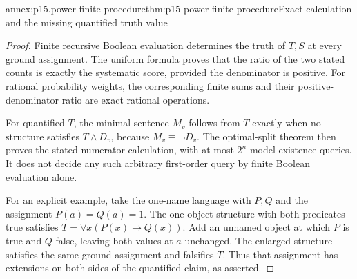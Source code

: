 \begin{annexitem}{annex:p15.power-finite-procedure}{thm:p15-power-finite-procedure}{Exact calculation and the missing quantified truth value}
\begin{proof}
Finite recursive Boolean
evaluation determines
the truth of \(T,S\)
at every ground
assignment. The uniform
formula proves that
the ratio of the
two stated counts
is exactly the
systematic score,
provided the denominator
is positive.
For rational probability
weights, the corresponding
finite sums and their
positive-denominator ratio
are exact rational
operations.

For quantified \(T\),
the minimal sentence
\(M_v\) follows
from \(T\) exactly
when no structure
satisfies \(T\land D_v\),
because \(M_v\equiv\neg D_v\).
The optimal-split
theorem then proves
the stated numerator
calculation, with
at most \(2^n\)
model-existence queries.
It does not decide
any such arbitrary
first-order query
by finite Boolean
evaluation alone.

For an explicit
example, take the
one-name language
with \(P,Q\) and
the assignment
\(P(a)=Q(a)=1\).
The one-object
structure with both
predicates true
satisfies
\(T=\forall x(P(x)\to Q(x))\).
Add an unnamed
object at which
\(P\) is true
and \(Q\) false,
leaving both values
at \(a\) unchanged.
The enlarged structure
satisfies the same
ground assignment
and falsifies \(T\).
Thus that assignment
has extensions on
both sides of
the quantified
claim, as asserted.
\end{proof}
\end{annexitem}
